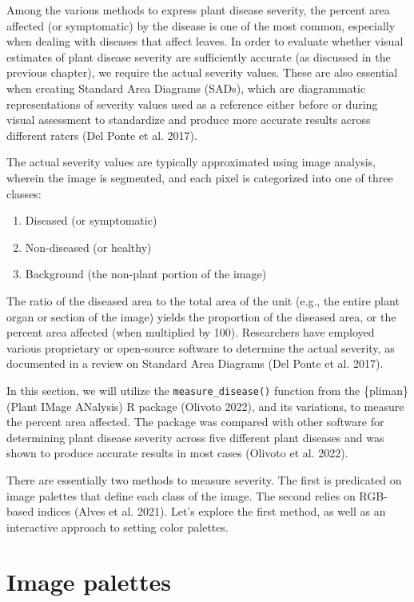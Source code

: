 \documentclass[
  letterpaper,
]{book}
\providecommand{\tightlist}{%
  \setlength{\itemsep}{0pt}\setlength{\parskip}{0pt}}\usepackage{longtable,booktabs,array}
\begin{document}
Among the various methods to express plant disease severity, the percent
area affected (or symptomatic) by the disease is one of the most common,
especially when dealing with diseases that affect leaves. In order to
evaluate whether visual estimates of plant disease severity are
sufficiently accurate (as discussed in the previous chapter), we require
the actual severity values. These are also essential when creating
Standard Area Diagrams (SADs), which are diagrammatic representations of
severity values used as a reference either before or during visual
assessment to standardize and produce more accurate results across
different raters (Del Ponte et al. 2017).

The actual severity values are typically approximated using image
analysis, wherein the image is segmented, and each pixel is categorized
into one of three classes:

\begin{enumerate}
\def\labelenumi{\arabic{enumi}.}
\tightlist
\item
  Diseased (or symptomatic)
\item
  Non-diseased (or healthy)
\item
  Background (the non-plant portion of the image)
\end{enumerate}

The ratio of the diseased area to the total area of the unit (e.g., the
entire plant organ or section of the image) yields the proportion of the
diseased area, or the percent area affected (when multiplied by 100).
Researchers have employed various proprietary or open-source software to
determine the actual severity, as documented in a review on Standard
Area Diagrams (Del Ponte et al. 2017).

In this section, we will utilize the \texttt{measure\_disease()}
function from the \{pliman\} (Plant IMage ANalysis) R package (Olivoto
2022), and its variations, to measure the percent area affected. The
package was compared with other software for determining plant disease
severity across five different plant diseases and was shown to produce
accurate results in most cases (Olivoto et al. 2022).

There are essentially two methods to measure severity. The first is
predicated on image palettes that define each class of the image. The
second relies on RGB-based indices (Alves et al. 2021). Let's explore
the first method, as well as an interactive approach to setting color
palettes.

\hypertarget{image-palettes}{%
\section{Image palettes}\label{image-palettes}}
\end{document}
